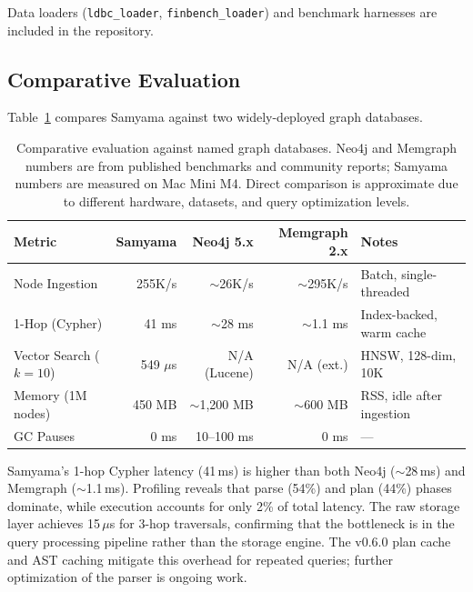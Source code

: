\documentclass[11pt]{article}
\begin{document}
Data loaders (\texttt{ldbc\_loader}, \texttt{finbench\_loader}) and benchmark harnesses are included in the repository.

\subsection{Comparative Evaluation}
\label{sec:comparison}

Table~\ref{tab:comparison} compares Samyama against two widely-deployed graph databases.

\begin{table}[H]
  \centering
  \caption{Comparative evaluation against named graph databases. Neo4j and Memgraph numbers are from published benchmarks and community reports; Samyama numbers are measured on Mac Mini M4. Direct comparison is approximate due to different hardware, datasets, and query optimization levels.}
  \label{tab:comparison}
  \begin{tabular}{@{}lrrrl@{}}
    \toprule
    \textbf{Metric} & \textbf{Samyama} & \textbf{Neo4j 5.x} & \textbf{Memgraph 2.x} & \textbf{Notes} \\
    \midrule
    Node Ingestion      & 255K/s          & ${\sim}$26K/s   & ${\sim}$295K/s & Batch, single-threaded \\
    1-Hop (Cypher)      & 41 ms           & ${\sim}$28 ms   & ${\sim}$1.1 ms & Index-backed, warm cache \\
    Vector Search ($k{=}10$) & 549 $\mu$s  & N/A (Lucene)    & N/A (ext.)     & HNSW, 128-dim, 10K \\
    Memory (1M nodes)   & 450 MB          & ${\sim}$1,200 MB& ${\sim}$600 MB & RSS, idle after ingestion \\
    GC Pauses           & 0 ms            & 10--100 ms      & 0 ms           & --- \\
    \bottomrule
  \end{tabular}
\end{table}

Samyama's 1-hop Cypher latency (41\,ms) is higher than both Neo4j (${\sim}$28\,ms) and Memgraph (${\sim}$1.1\,ms). Profiling reveals that parse (54\%) and plan (44\%) phases dominate, while execution accounts for only 2\% of total latency. The raw storage layer achieves 15\,$\mu$s for 3-hop traversals, confirming that the bottleneck is in the query processing pipeline rather than the storage engine. The v0.6.0 plan cache and AST caching mitigate this overhead for repeated queries; further optimization of the parser is ongoing work.
\end{document}

